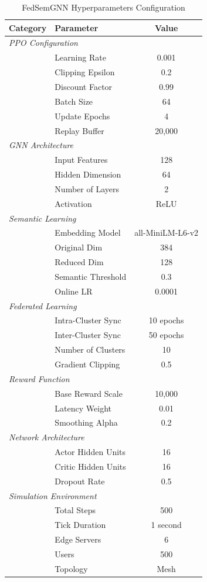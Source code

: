 
\begin{table}[t]
\centering
\caption{FedSemGNN Hyperparameters Configuration}
\label{tab:hyperparameters_ieee}
\small
\begin{tabular}{@{}llc@{}}
\toprule
\textbf{Category} & \textbf{Parameter} & \textbf{Value} \\
\midrule
\multicolumn{3}{l}{\textit{PPO Configuration}} \\
& Learning Rate & 0.001 \\
& Clipping Epsilon & 0.2 \\
& Discount Factor & 0.99 \\
& Batch Size & 64 \\
& Update Epochs & 4 \\
& Replay Buffer & 20,000 \\
\midrule
\multicolumn{3}{l}{\textit{GNN Architecture}} \\
& Input Features & 128 \\
& Hidden Dimension & 64 \\
& Number of Layers & 2 \\
& Activation & ReLU \\
\midrule
\multicolumn{3}{l}{\textit{Semantic Learning}} \\
& Embedding Model & all-MiniLM-L6-v2 \\
& Original Dim & 384 \\
& Reduced Dim & 128 \\
& Semantic Threshold & 0.3 \\
& Online LR & 0.0001 \\
\midrule
\multicolumn{3}{l}{\textit{Federated Learning}} \\
& Intra-Cluster Sync & 10 epochs \\
& Inter-Cluster Sync & 50 epochs \\
& Number of Clusters & 10 \\
& Gradient Clipping & 0.5 \\
\midrule
\multicolumn{3}{l}{\textit{Reward Function}} \\
& Base Reward Scale & 10,000 \\
& Latency Weight & 0.01 \\
& Smoothing Alpha & 0.2 \\
\midrule
\multicolumn{3}{l}{\textit{Network Architecture}} \\
& Actor Hidden Units & 16 \\
& Critic Hidden Units & 16 \\
& Dropout Rate & 0.5 \\
\midrule
\multicolumn{3}{l}{\textit{Simulation Environment}} \\
& Total Steps & 500 \\
& Tick Duration & 1 second \\
& Edge Servers & 6 \\
& Users & 500 \\
& Topology & Mesh \\
\bottomrule
\end{tabular}
\end{table}

